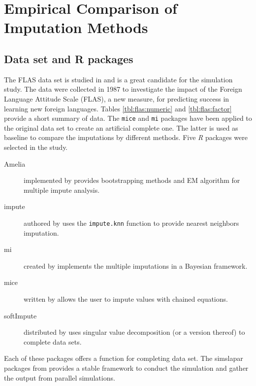 \chapter{Empirical Comparison of Imputation Methods}



\section{Data set and R packages}

The FLAS data set is studied in \cite{schafer1997analysis} and is a great
candidate for the simulation study. The data were collected in 1987 to
investigate the impact of the Foreign Language Attitude Scale (FLAS), a new
measure, for predicting success in learning new foreign languages. Tables
\ref{tbl:flas:numeric} and \ref{tbl:flas:factor} provide a short summary of
data. The \texttt{mice} and \texttt{mi} packages have been applied to the
original data set to create an artificial complete one. The latter is used as
baseline to compare the imputations by different methods. Five \emph{R}
packages were selected in the study.
\begin{description}
\item[Amelia] implemented by \cite{honaker2011amelia} provides bootstrapping
  methods and EM algorithm for multiple impute analysis.
\item[impute] authored by \cite{hastie1999impute} uses the
  \texttt{impute.knn} function to provide nearest neighbors imputation.
\item[mi] created by \cite{gelman2011mi} implements the multiple imputations in
  a Bayesian framework.
\item[mice] written by \cite{vanburren2011mice} allows the user to impute
  values with chained equations.
\item[softImpute] distributed by \cite{hastie2015softimpute} uses singular value
  decomposition (or a version thereof) to complete data sets.
\end{description}

Each of these packages offers a function for completing data set. The simslapar
packages from \cite{hofert2015simsalpar} provides a stable framework to conduct
the simulation and gather the output from parallel simulations.

